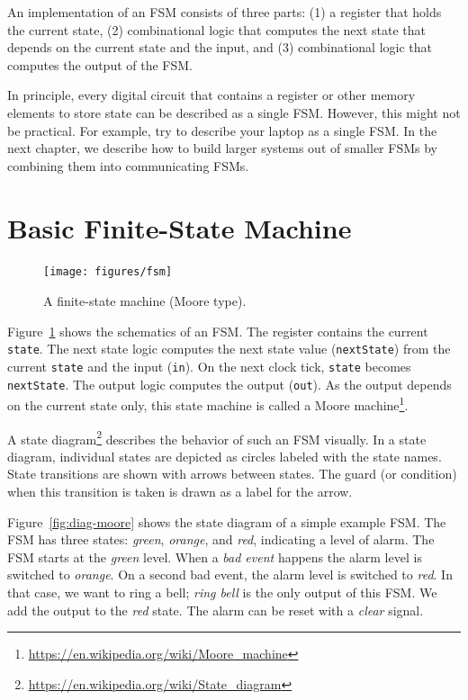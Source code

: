 \documentclass[%
    10pt,
    headinclude, footexclude,
    openright, %
    notitlepage,
    cleardoubleempty,
    headsepline,
    pointlessnumbers,
    bibtotoc, idxtotoc,
    ]{scrbook}
\newcommand{\code}[1]{{\small{\texttt{#1}}}}
\newcommand{\myref}[2]{\href{#1}{#2}}
\renewcommand{\myref}[2]{{#2}{\footnote{\url{#1}}}}
\begin{document}
An implementation of an FSM consists of three parts: (1) a register that holds the current state,
(2) combinational logic that computes the next state that depends on the current
state and the input, and (3) combinational logic that computes the output of the FSM.

In principle, every digital circuit that contains a register or other memory elements
to store state can be described as a single FSM. However, this might
not be practical. For example, try to describe your laptop as a single FSM.
In the next chapter, we describe how to build larger systems
out of smaller FSMs by combining them into communicating FSMs.

\section{Basic Finite-State Machine}

\begin{figure}
  \centering
  \texttt{[image: figures/fsm]} %
  \caption{A finite-state machine (Moore type).}
  \label{fig:fsm}
\end{figure}

Figure~\ref{fig:fsm} shows the schematics of an FSM. The register contains the current \code{state}.
The next state logic computes the next state value (\code{nextState})
from the current \code{state} and the input (\code{in}).
On the next clock tick, \code{state} becomes \code{nextState}.
The output logic computes the output (\code{out}). As the output depends on the current
state only, this state machine is called a
\myref{https://en.wikipedia.org/wiki/Moore_machine}{Moore machine}.


A \myref{https://en.wikipedia.org/wiki/State_diagram}{state diagram}
describes the behavior of such an FSM visually.
In a state diagram, individual states are depicted as circles labeled
with the state names.
State transitions are shown with arrows between states.
The guard (or condition) when this transition is taken is drawn as a label
for the arrow.

Figure~\ref{fig:diag-moore} shows the state diagram of a simple example FSM.
The FSM has three states: \emph{green}, \emph{orange}, and \emph{red},
indicating a level of alarm. The FSM starts at the \emph{green} level.
When a \emph{bad event} happens the alarm level is switched to \emph{orange}.
On a second bad event, the alarm level is switched to \emph{red}.
In that case, we want to ring a bell; \emph{ring bell} is the only output of this FSM.
We add the output to the \emph{red} state.
The alarm can be reset with a \emph{clear} signal.
\end{document}
